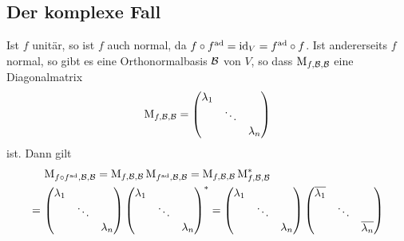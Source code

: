 \subsection{Der komplexe Fall}

Ist $f$ unitär, so ist $f$ auch normal, da $f \circ f^{\operatorname{ad}} = \operatorname{id}_V = f^{\operatorname{ad}} \circ f$.
Ist andererseits $f$ normal, so gibt es eine Orthonormalbasis $\mathcal{B}$ von $V$, so dass $\operatorname{M}_{f, \mathcal{B}, \mathcal{B}}$ eine Diagonalmatrix
\[
    \operatorname{M}_{f, \mathcal{B}, \mathcal{B}}
  = \begin{pmatrix}
      \lambda_1 &         &           \\
                & \ddots  &           \\
                &         & \lambda_n
    \end{pmatrix}
\]
ist.
Dann gilt
\begin{align*}
   &\,  \repmatrixendo{f \circ \adj{f}}{\basis{B}}
  =     \repmatrixendo{f}{\basis{B}} \repmatrixendo{\adj{f}}{\basis{B}}
  =     \repmatrixendo{f}{\basis{B}} \madj{\repmatrixendo{f}{\basis{B}}}
  \\
  =&\,  \begin{pmatrix}
          \lambda_1 &         &           \\
                    & \ddots  &           \\
                    &         & \lambda_n
        \end{pmatrix}
        \madj{
        \begin{pmatrix}
          \lambda_1 &         &           \\
                    & \ddots  &           \\
                    &         & \lambda_n
        \end{pmatrix}}
  =     \begin{pmatrix}
          \lambda_1 &         &           \\
                    & \ddots  &           \\
                    &         & \lambda_n
        \end{pmatrix}
        \begin{pmatrix}
          \conjugate{\lambda_1} &         &                       \\
                                & \ddots  &                       \\
                                &         & \conjugate{\lambda_n}
        \end{pmatrix}
  \\

\end{align*}
